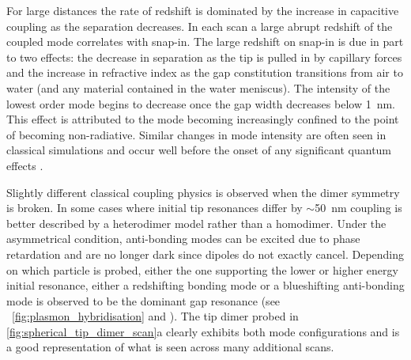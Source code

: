 \documentclass[a4paper]{article}
\begin{document}
For large distances the rate of redshift is dominated by the increase in capacitive coupling as the separation decreases. In each scan a large abrupt redshift of the coupled mode correlates with snap-in. The large redshift on snap-in is due in part to two effects: the decrease in separation as the tip is pulled in by capillary forces and the increase in refractive index as the gap constitution transitions from air to water (and any material contained in the water meniscus). The intensity of the lowest order mode begins to decrease once the gap width decreases below \SI{1}{nm}. This effect is attributed to the mode becoming increasingly confined to the point of becoming non-radiative. Similar changes in mode intensity are often seen in classical simulations and occur well before the onset of any significant quantum effects \cite{savage2012, esteban2015}.


Slightly different classical coupling physics is observed when the dimer symmetry is broken. In some cases where initial tip resonances differ by $\sim$\SI{50}{nm} coupling is better described by a heterodimer model rather than a homodimer. Under the asymmetrical condition, anti-bonding modes can be excited due to phase retardation and are no longer dark since dipoles do not exactly cancel. Depending on which particle is probed, either the one supporting the lower or higher energy initial resonance, either a redshifting bonding mode or a blueshifting anti-bonding mode is observed to be the dominant gap resonance (see \figurename~\ref{fig:plasmon_hybridisation} and \cite{nordlander2004}). The tip dimer probed in \autoref{fig:spherical_tip_dimer_scan}a clearly exhibits both mode configurations and is a good representation of what is seen across many additional scans.
\end{document}
